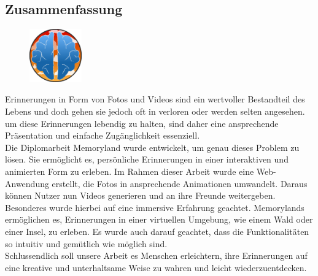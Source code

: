 \newpage
\begin{spacing}{1}
    \chapter*{Zusammenfassung}
\end{spacing}
\begin{figure}
    \begin{center}
      \includegraphics[width=0.2\textwidth]{pics/memoryland-logo.png}
    \end{center}
\end{figure}
Erinnerungen in Form von Fotos und Videos sind ein wertvoller Bestandteil des Lebens und doch
gehen sie jedoch oft in verloren oder werden selten angesehen. um diese Erinnerungen lebendig zu halten,
sind daher eine ansprechende Präsentation und einfache Zugänglichkeit essenziell.
\\
Die Diplomarbeit Memoryland wurde entwickelt, um genau dieses Problem zu lösen. Sie ermöglicht es, 
persönliche Erinnerungen in einer interaktiven und animierten Form zu erleben. Im Rahmen dieser 
Arbeit wurde eine Web-Anwendung erstellt, die Fotos in ansprechende Animationen umwandelt. 
Daraus können Nutzer nun Videos generieren und an ihre Freunde weitergeben.
\\
Besonderes wurde hierbei auf eine immersive Erfahrung geachtet. Memorylands ermöglichen es, 
Erinnerungen in einer virtuellen Umgebung, wie einem Wald oder einer Insel, zu erleben. Es
wurde auch darauf geachtet, dass die Funktionalitäten so intuitiv und gemütlich wie möglich
sind.
\\
Schlussendlich soll unsere Arbeit es Menschen erleichtern, ihre Erinnerungen auf eine 
kreative und unterhaltsame Weise zu wahren und leicht wiederzuentdecken.

